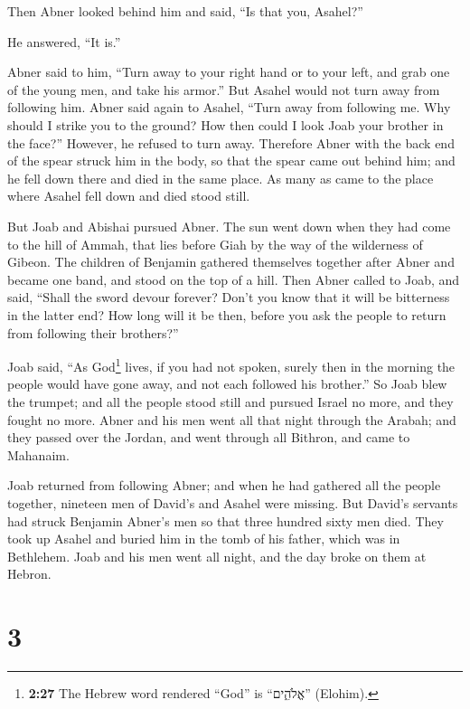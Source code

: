  Then Abner looked behind him and said, ``Is that you,
Asahel?''

He answered, ``It is.''

 Abner said to him, ``Turn away to your right hand or to
your left, and grab one of the young men, and take his armor.'' But
Asahel would not turn away from following him.  Abner
said again to Asahel, ``Turn away from following me. Why should I strike
you to the ground? How then could I look Joab your brother in the
face?''  However, he refused to turn away. Therefore
Abner with the back end of the spear struck him in the body, so that the
spear came out behind him; and he fell down there and died in the same
place. As many as came to the place where Asahel fell down and died
stood still.

 But Joab and Abishai pursued Abner. The sun went down
when they had come to the hill of Ammah, that lies before Giah by the
way of the wilderness of Gibeon.  The children of
Benjamin gathered themselves together after Abner and became one band,
and stood on the top of a hill.  Then Abner called to
Joab, and said, ``Shall the sword devour forever? Don't you know that it
will be bitterness in the latter end? How long will it be then, before
you ask the people to return from following their brothers?''

 Joab said, ``As God\footnote{\textbf{2:27} The Hebrew
  word rendered ``God'' is ``אֱלֹהִ֑ים'' (Elohim).} lives, if you had
not spoken, surely then in the morning the people would have gone away,
and not each followed his brother.''  So Joab blew the
trumpet; and all the people stood still and pursued Israel no more, and
they fought no more.  Abner and his men went all that
night through the Arabah; and they passed over the Jordan, and went
through all Bithron, and came to Mahanaim.

 Joab returned from following Abner; and when he had
gathered all the people together, nineteen men of David's and Asahel
were missing.  But David's servants had struck Benjamin
Abner's men so that three hundred sixty men died.  They
took up Asahel and buried him in the tomb of his father, which was in
Bethlehem. Joab and his men went all night, and the day broke on them at
Hebron.

\hypertarget{section-2}{%
\section{3}\label{section-2}}

